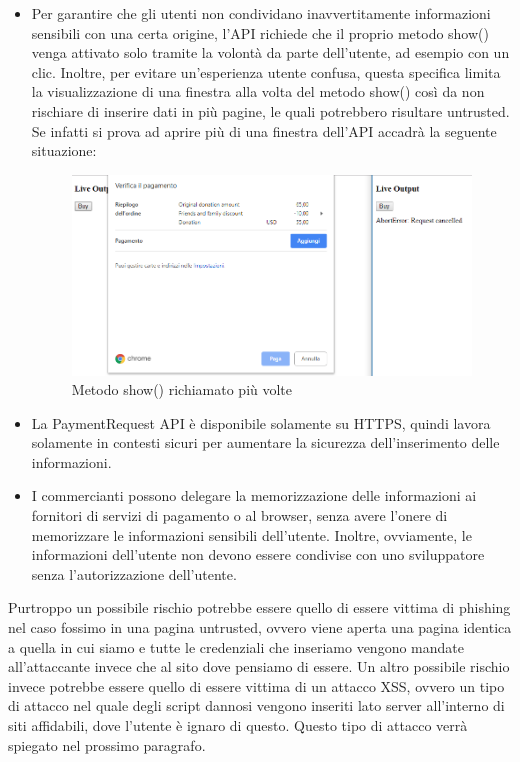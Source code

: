 \documentclass[11pt ,a4paper , twoside , openright ]{article}
\begin{document}
\begin{itemize}
\item Per garantire che gli utenti non condividano inavvertitamente informazioni sensibili con una certa origine, l'API richiede che il proprio metodo show() venga attivato solo tramite la volontà da parte dell'utente, ad esempio con un clic. Inoltre, per evitare un'esperienza utente confusa, questa specifica limita la visualizzazione di una finestra alla volta del metodo show() così da non rischiare di inserire dati in più pagine, le quali potrebbero risultare untrusted. 
Se infatti si prova ad aprire più di una finestra dell'API accadrà la seguente situazione:

\begin{figure}[h]
	\centering
	\includegraphics[width=0.5\linewidth]{Buy}
	\caption{Metodo show() richiamato più volte}
	\label{fig: Metodo show() richiamato più volte}
\end{figure}


\item La PaymentRequest API è disponibile solamente su HTTPS, quindi lavora solamente in contesti sicuri per aumentare la sicurezza dell'inserimento delle informazioni. 

\item I commercianti possono delegare la memorizzazione delle informazioni ai fornitori di servizi di pagamento o al browser, senza avere l'onere di memorizzare le informazioni sensibili dell'utente. Inoltre, ovviamente, le informazioni dell'utente non devono essere condivise con uno sviluppatore senza l'autorizzazione dell'utente.
\end{itemize}

Purtroppo un possibile rischio potrebbe essere quello di essere vittima di phishing nel caso fossimo in una pagina untrusted, ovvero viene aperta una pagina identica a quella in cui siamo e tutte le credenziali che inseriamo vengono mandate all'attaccante invece che al sito dove pensiamo di essere. 
Un altro possibile rischio invece potrebbe essere quello di essere vittima di un attacco XSS, ovvero un tipo di attacco nel quale degli script dannosi vengono inseriti lato server all'interno di siti affidabili, dove l'utente è ignaro di questo.
Questo tipo di attacco verrà spiegato nel prossimo paragrafo.
\end{document}
